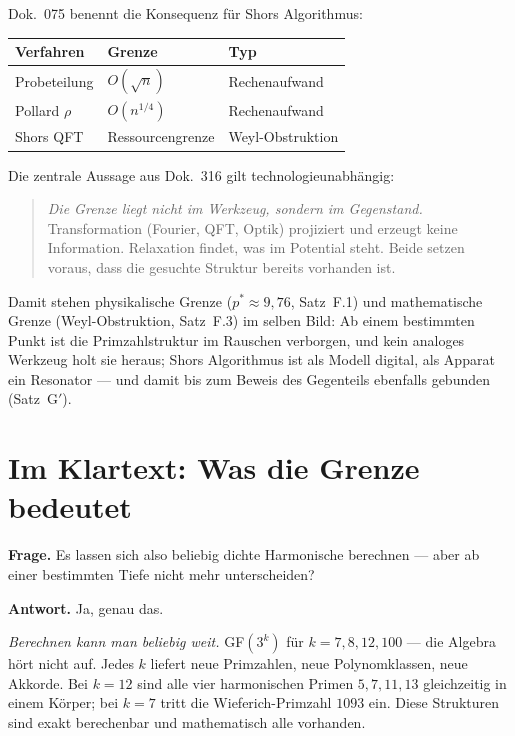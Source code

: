 Dok.~075 benennt die Konsequenz für Shors Algorithmus:

\begin{center}
\begin{tabular}{@{}lll@{}}
\toprule
Verfahren & Grenze & Typ \\
\midrule
Probeteilung & $O(\sqrt{n})$ & Rechenaufwand \\
Pollard $\rho$ & $O(n^{1/4})$ & Rechenaufwand \\
Shors QFT & Ressourcengrenze & Weyl-Obstruktion \\
\bottomrule
\end{tabular}
\end{center}

Die zentrale Aussage aus Dok.~316 gilt technologieunabhängig:
\begin{quote}
\emph{Die Grenze liegt nicht im Werkzeug, sondern im Gegenstand.}
Transformation (Fourier, QFT, Optik) projiziert und erzeugt keine
Information. Relaxation findet, was im Potential steht. Beide setzen
voraus, dass die gesuchte Struktur bereits vorhanden ist.
\end{quote}

Damit stehen physikalische Grenze ($p^* \approx 9{,}76$, Satz~F.1) und
mathematische Grenze (Weyl-Obstruktion, Satz~F.3) im selben Bild:
Ab einem bestimmten Punkt ist die Primzahlstruktur im Rauschen verborgen,
und kein analoges Werkzeug holt sie heraus; Shors Algorithmus ist als Modell digital,
als Apparat ein Resonator --- und damit bis zum Beweis des Gegenteils ebenfalls gebunden (Satz~G$'$).

\section{Im Klartext: Was die Grenze bedeutet}

\textbf{Frage.} Es lassen sich also beliebig dichte Harmonische berechnen ---
aber ab einer bestimmten Tiefe nicht mehr unterscheiden?

\textbf{Antwort.} Ja, genau das.

\emph{Berechnen kann man beliebig weit.} GF$(3^k)$ für $k = 7, 8, 12, 100$ ---
die Algebra hört nicht auf. Jedes $k$ liefert neue Primzahlen, neue
Polynomklassen, neue Akkorde. Bei $k = 12$ sind alle vier harmonischen Primen
$5, 7, 11, 13$ gleichzeitig in einem Körper; bei $k = 7$ tritt die
Wieferich-Primzahl $1093$ ein. Diese Strukturen sind exakt berechenbar und
mathematisch alle vorhanden.

